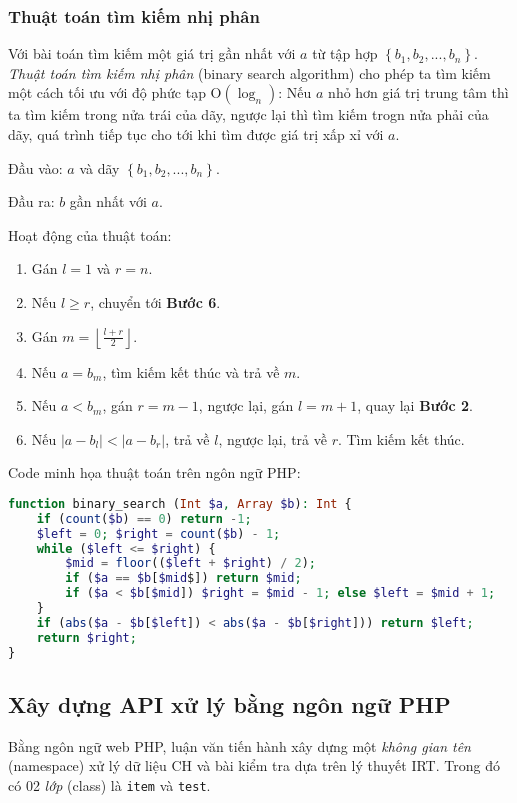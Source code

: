 \subsubsection{Thuật toán tìm kiếm nhị phân}
Với bài toán tìm kiếm một giá trị gần nhất với $a$ từ tập hợp $\left\{b_1,b_2,...,b_n\right\}$. \textit{Thuật toán tìm kiếm nhị phân} (binary search algorithm) cho phép ta tìm kiếm một cách tối ưu với độ phức tạp $\mathrm{O}\left(\log_n\right)$: Nếu $a$ nhỏ hơn giá trị trung tâm thì ta tìm kiếm trong nửa trái của dãy, ngược lại thì tìm kiếm trogn nửa phải của dãy, quá trình tiếp tục cho tới khi tìm được giá trị xấp xỉ với $a$.\par
\noindent Đầu vào: $a$ và dãy $\left\{b_1,b_2,...,b_n\right\}$.\par
\noindent Đầu ra: $b$ gần nhất với $a$.\par
\noindent Hoạt động của thuật toán:\par
\begin{enumerate}[label=\textbf{Bước \arabic*.},align=left,left=0cm..0cm,itemindent=*]
	\item Gán $l=1$ và $r=n$.
	\item Nếu $l\geqslant r$, chuyển tới \textbf{Bước 6}.
	\item Gán $m=\left\lfloor\frac{l+r}{2}\right\rfloor$.
	\item Nếu $a=b_m$, tìm kiếm kết thúc và trả về $m$.
	\item Nếu $a<b_m$, gán $r=m-1$, ngược lại, gán $l=m+1$, quay lại \textbf{Bước 2}.
	\item Nếu $|a-b_l|<|a-b_r|$, trả về $l$, ngược lại, trả về $r$. Tìm kiếm kết thúc.
\end{enumerate}
\noindent Code minh họa thuật toán trên ngôn ngữ PHP:
\begin{lstlisting}[language=php,caption=Phương thức tìm kiếm nhị phân]
function binary_search (Int $a, Array $b): Int {
	if (count($b) == 0) return -1;
	$left = 0; $right = count($b) - 1;
	while ($left <= $right) {
		$mid = floor(($left + $right) / 2);
		if ($a == $b[$mid$]) return $mid;
		if ($a < $b[$mid]) $right = $mid - 1; else $left = $mid + 1;
	}
	if (abs($a - $b[$left]) < abs($a - $b[$right])) return $left;
	return $right;
}
\end{lstlisting}
\subsection{Xây dựng API xử lý bằng ngôn ngữ PHP}
Bằng ngôn ngữ web PHP, luận văn tiến hành xây dựng một \textit{không gian tên} (namespace) xử lý dữ liệu CH và bài kiểm tra dựa trên lý thuyết IRT. Trong đó có 02 \textit{lớp} (class) là \texttt{item} và \texttt{test}.
